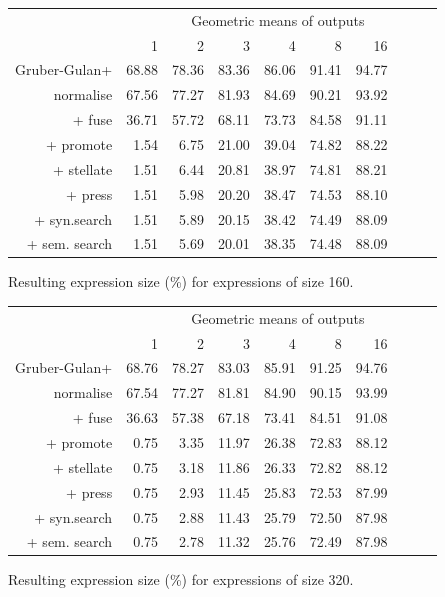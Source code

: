 \begin{figure}\begin{tabular}{rrrrrrrrrr}
 & \multicolumn{9}{c}{Geometric means of outputs} \\
 & 1 & 2 & 3 & 4 & 8 & 16 \\
Gruber-Gulan+ & 68.88 & 78.36 & 83.36 & 86.06 & 91.41 & 94.77 \\
normalise & 67.56 & 77.27 & 81.93 & 84.69 & 90.21 & 93.92 \\
+ fuse & 36.71 & 57.72 & 68.11 & 73.73 & 84.58 & 91.11 \\
+ promote & 1.54 & 6.75 & 21.00 & 39.04 & 74.82 & 88.22 \\
+ stellate & 1.51 & 6.44 & 20.81 & 38.97 & 74.81 & 88.21 \\
+ press & 1.51 & 5.98 & 20.20 & 38.47 & 74.53 & 88.10 \\
+ syn.search & 1.51 & 5.89 & 20.15 & 38.42 & 74.49 & 88.09 \\
+ sem. search & 1.51 & 5.69 & 20.01 & 38.35 & 74.48 & 88.09 \\
\end{tabular}\caption{Resulting expression size (\%) for expressions of size 160.}\end{figure}
\begin{figure}\begin{tabular}{rrrrrrrrrr}
 & \multicolumn{9}{c}{Geometric means of outputs} \\
 & 1 & 2 & 3 & 4 & 8 & 16 \\
Gruber-Gulan+ & 68.76 & 78.27 & 83.03 & 85.91 & 91.25 & 94.76 \\
normalise & 67.54 & 77.27 & 81.81 & 84.90 & 90.15 & 93.99 \\
+ fuse & 36.63 & 57.38 & 67.18 & 73.41 & 84.51 & 91.08 \\
+ promote & 0.75 & 3.35 & 11.97 & 26.38 & 72.83 & 88.12 \\
+ stellate & 0.75 & 3.18 & 11.86 & 26.33 & 72.82 & 88.12 \\
+ press & 0.75 & 2.93 & 11.45 & 25.83 & 72.53 & 87.99 \\
+ syn.search & 0.75 & 2.88 & 11.43 & 25.79 & 72.50 & 87.98 \\
+ sem. search & 0.75 & 2.78 & 11.32 & 25.76 & 72.49 & 87.98 \\
\end{tabular}\caption{Resulting expression size (\%) for expressions of size 320.}\end{figure}
